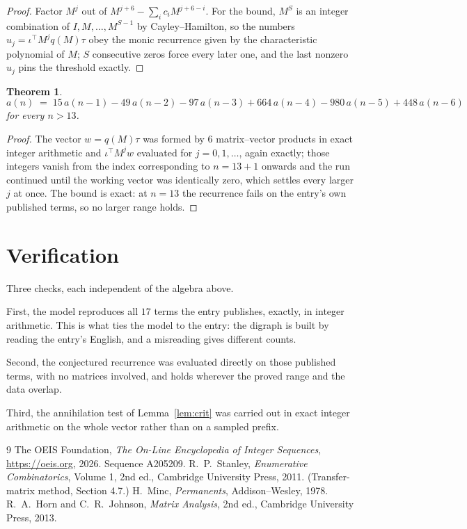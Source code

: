 \documentclass[11pt,a4paper]{article}
\theoremstyle{plain}
\newtheorem{theorem}{Theorem}
\theoremstyle{definition}
\begin{document}
\begin{proof}
Factor $M^{j}$ out of $M^{j+6}-\sum_ic_iM^{j+6-i}$. For the bound, $M^{S}$
is an integer combination of $I,M,\dots,M^{S-1}$ by Cayley--Hamilton, so the numbers
$u_j=\iota^{\!\top}M^{j}q(M)\tau$ obey the monic recurrence given by the characteristic
polynomial of $M$; $S$ consecutive zeros force every later one, and the last nonzero $u_j$
pins the threshold exactly.
\end{proof}

\begin{theorem}
\[
a(n)\;=\;15\,a(n-1) - 49\,a(n-2) - 97\,a(n-3) + 664\,a(n-4) - 980\,a(n-5) + 448\,a(n-6)
\]
for every $n>13$.
\end{theorem}

\begin{proof}
The vector $w=q(M)\tau$ was formed by $6$ matrix--vector products in exact integer
arithmetic and $\iota^{\!\top}M^{j}w$ evaluated for $j=0,1,\dots$, again exactly; those
integers vanish from the index corresponding to $n=13+1$ onwards and the run continued
until the working vector was identically zero, which settles every larger $j$ at once. The bound is exact: at $n=13$ the recurrence fails on the entry's own published terms, so no larger range holds.
\end{proof}

\section{Verification}

Three checks, each independent of the algebra above.

First, the model reproduces all $17$ terms the entry publishes, exactly, in integer
arithmetic. This is what ties the model to the entry: the digraph is built by reading the
entry's English, and a misreading gives different counts.

Second, the conjectured recurrence was evaluated directly on those published terms, with no
matrices involved, and holds wherever the proved range and the data overlap.

Third, the annihilation test of Lemma~\ref{lem:crit} was carried out in exact integer
arithmetic on the whole vector rather than on a sampled prefix.

\begin{thebibliography}{9}
 The OEIS Foundation, \emph{The On-Line Encyclopedia of Integer
Sequences}, \url{https://oeis.org}, 2026. Sequence A205209.
 R.~P.~Stanley, \emph{Enumerative Combinatorics}, Volume 1, 2nd ed.,
Cambridge University Press, 2011. (Transfer-matrix method, Section 4.7.)
 H.~Minc, \emph{Permanents}, Addison--Wesley, 1978.
 R.~A.~Horn and C.~R.~Johnson, \emph{Matrix Analysis}, 2nd ed., Cambridge
University Press, 2013.
\end{thebibliography}
\end{document}
